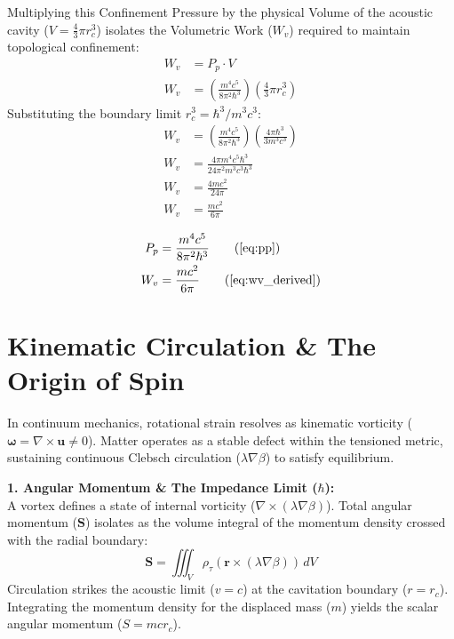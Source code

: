 Multiplying this Confinement Pressure by the physical Volume of the acoustic cavity ($V = \frac{4}{3}\pi r_c^3$) isolates the Volumetric Work ($W_v$) required to maintain topological confinement:
\begin{align}
    W_v &= P_p \cdot V \nonumber \\
    W_v &= \left( \frac{m^4 c^5}{8\pi^2 \hbar^3} \right) \left( \frac{4}{3}\pi r_c^3 \right) \nonumber
\end{align}
Substituting the boundary limit $r_c^3 = \hbar^3 / m^3 c^3$:
\begin{align}
    W_v &= \left( \frac{m^4 c^5}{8\pi^2 \hbar^3} \right) \left( \frac{4\pi \hbar^3}{3 m^3 c^3} \right) \nonumber \\
    W_v &= \frac{4\pi m^4 c^5 \hbar^3}{24\pi^2 m^3 c^3 \hbar^3} \nonumber \\
    W_v &= \frac{4 m c^2}{24 \pi} \nonumber \\
    W_v &= \frac{m c^2}{6\pi} \label{eq:wv_derived}
\end{align}

\begin{tcolorbox}[recallbox, title={\ref{box:bag_pressure}. Confinement Pressure \& Work}]
\begin{align}
    P_p &= \frac{m^4 c^5}{8\pi^2 \hbar^3} \tag{\ref{eq:pp}} \\
    W_v &= \frac{m c^2}{6\pi} \tag{\ref{eq:wv_derived}} 
\end{align}
\end{tcolorbox}

\section{Kinematic Circulation \& The Origin of Spin} 
\label{sec:deriv_quantum_spin}

In continuum mechanics, rotational strain resolves as kinematic vorticity ($\boldsymbol{\omega} = \nabla \times \mathbf{u} \neq 0$). Matter operates as a stable defect within the tensioned metric, sustaining continuous Clebsch circulation ($\lambda \nabla \beta$) to satisfy equilibrium. 

\textbf{1. Angular Momentum \& The Impedance Limit ($\hbar$):} \\
A vortex defines a state of internal vorticity ($\nabla \times (\lambda \nabla \beta)$). Total angular momentum ($\mathbf{S}$) isolates as the volume integral of the momentum density crossed with the radial boundary: 
\begin{equation}
    \mathbf{S} = \iiint_V \rho_{\tau} (\mathbf{r} \times (\lambda \nabla \beta)) \, dV 
\end{equation}
Circulation strikes the acoustic limit ($v = c$) at the cavitation boundary ($r = r_c$). Integrating the momentum density for the displaced mass ($m$) yields the scalar angular momentum ($S = mcr_c$). 

